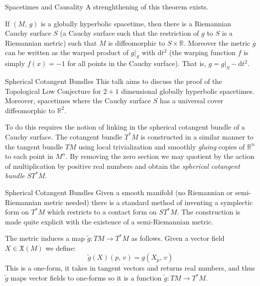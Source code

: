 \documentclass{beamer}
\begin{document}
    \begin{frame}{Spacetimes and Causality}
        A strenghthening of this theorem exists.
        \begin{theorem}
            If $(M,\,g)$ is a globally hyperbolic spacetime, then there is a
            Riemannian Cauchy surface $S$ (a Cauchy surface such that the
            restriction of $g$ to $S$ is a Riemannian metric) such that
            $M$ is diffeomorphic to $S\times\mathbb{R}$. Moreover the metric
            $g$ can be written as the warped product of $g|_{S}$ with
            $\textrm{d}t^{2}$ (the warping function $f$ is simply
            $f(x)=-1$ for all points in the Cauchy surface). That is,
            $g=g|_{S}-\textrm{d}t^{2}$.
        \end{theorem}
    \end{frame}
    \begin{frame}{Spherical Cotangent Bundles}
        This talk aims to discuss the proof of the Topological Low Conjecture
        for $2+1$ dimensional globally hyperbolic spacetimes. Moreover,
        spacetimes where the Cauchy surface $S$ has a universal cover
        diffeomorphic to $\mathbb{R}^{2}$.
        \par\hfill\par
        To do this requires the notion of linking in the spherical cotangent
        bundle of a Cauchy surface. The cotangent bundle $T^{*}M$ is
        constructed in a similar manner to the tangent bundle $TM$ using
        local trivialization and smoothly \textit{gluing} copies of
        $\mathbb{R}^{n}$ to each point in $M^{n}$. By removing the zero section
        we may quotient by the action of multiplication by positive real numbers
        and obtain the \textit{spherical cotangent bundle}
        $ST^{*}M$.
    \end{frame}
    \begin{frame}{Spherical Cotangent Bundles}
        Given a smooth manifold (no Riemannian or semi-Riemannian metric needed)
        there is a standard method of inventing a symplectic form on
        $T^{*}M$ which restricts to a contact form on $ST^{*}M$. The
        construction is made quite explicit with the existence of a
        semi-Riemannian metric.
        \par\hfill\par
        The metric induces a map $\tilde{g}:TM\rightarrow{T}^{*}M$ as follows.
        Given a vector field $X\in\mathfrak{X}(M)$ we define:
        \begin{equation}
            \tilde{g}(X)(p,\,v)=g(X_{p},\,v)
        \end{equation}
        This is a one-form, it takes in tangent vectors and returns real
        numbers, and thus $\tilde{g}$ maps vector fields to one-forms so it is
        a function $\tilde{g}:TM\rightarrow{T}^{*}M$.
    \end{frame}
\end{document}

